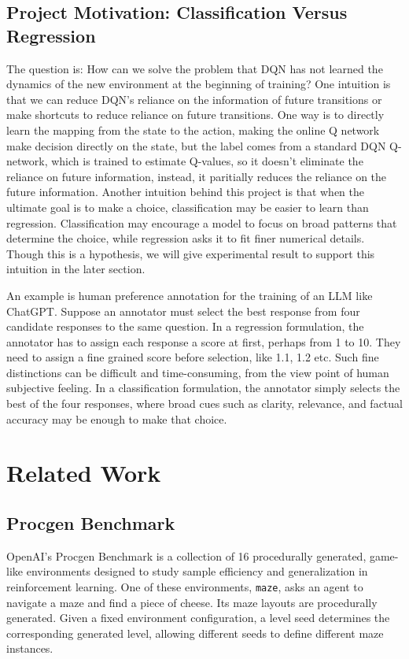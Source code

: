 \documentclass[a4paper,12pt]{article}
\begin{document}
\subsection{Project Motivation: Classification Versus Regression}

The question is: How can we solve the problem that DQN has not learned the dynamics of the new environment at the beginning of training? One intuition is that we can reduce DQN's reliance on the information of future transitions or make shortcuts to reduce reliance on future transitions. One way is to directly learn the mapping from the state to the action, making the online Q network make decision directly on the state, but the label comes from a standard DQN Q-network, which is trained to estimate Q-values, so it doesn't eliminate the reliance on future information, instead, it paritially reduces the reliance on the future information.
Another intuition behind this project is that when the ultimate goal is to make a choice, classification may be easier to learn than regression. Classification may encourage a model to focus on broad patterns that determine the choice, while regression asks it to fit finer numerical details. Though this is a hypothesis, we will give experimental result to support this intuition in the later section.

An example is human preference annotation for the training of an LLM like ChatGPT. Suppose an annotator must select the best response from four candidate responses to the same question. In a regression formulation, the annotator has to assign each response a score at first, perhaps from 1 to 10. They need to assign a fine grained score before selection, like 1.1, 1.2 etc. Such fine distinctions can be difficult and time-consuming, from the view point of human subjective feeling. In a classification formulation, the annotator simply selects the best of the four responses, where broad cues such as clarity, relevance, and factual accuracy may be enough to make that choice. 

\section{Related Work}

\subsection{Procgen Benchmark}

OpenAI's Procgen Benchmark is a collection of 16 procedurally generated, game-like environments designed to study sample efficiency and generalization in reinforcement learning\cite{cobbe2020,openai2019}. One of these environments, \texttt{maze}, asks an agent to navigate a maze and find a piece of cheese. Its maze layouts are procedurally generated\cite{procgenrepo}. Given a fixed environment configuration, a level seed determines the corresponding generated level, allowing different seeds to define different maze instances.
\end{document}
